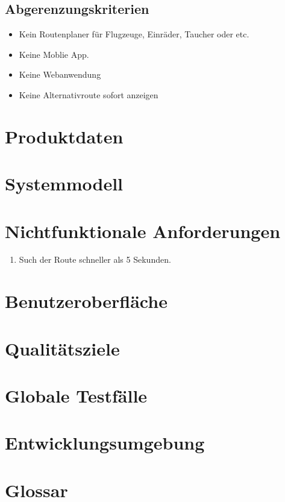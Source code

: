 \documentclass[a4paper, 11pt]{article}
\begin{document}
\subsection{Abgerenzungskriterien}

\begin{itemize}
\item Kein Routenplaner für Flugzeuge, Einräder, Taucher oder etc.
\item Keine Moblie App.
\item Keine Webanwendung
\item Keine Alternativroute sofort anzeigen

\end{itemize}


\section{Produktdaten}

\section{Systemmodell}

\section{Nichtfunktionale Anforderungen}

\begin{enumerate}
\item Such der Route schneller als 5 Sekunden.

\end{enumerate}

\section{Benutzeroberfläche}

\section{Qualitätsziele}

\section{Globale Testfälle}

\section{Entwicklungsumgebung}

\section{Glossar}
\end{document}
